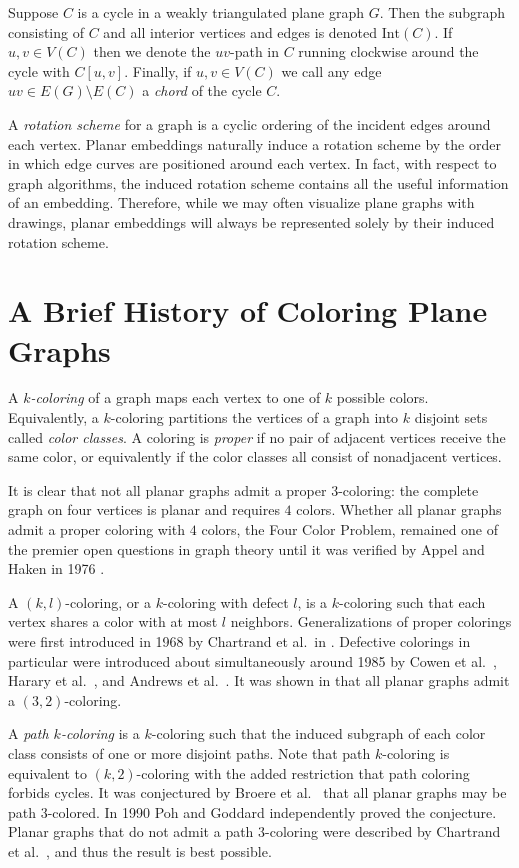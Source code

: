 \documentclass[letterpaper, 12pt]{article}
\theoremstyle{thm}
\begin{document}
Suppose $C$ is a cycle in a weakly
triangulated plane graph $G$. Then the subgraph consisting of $C$ and all interior
vertices and edges is denoted $\text{Int}(C)$. If $u,v \in V(C)$ then we denote
the $uv$-path in $C$ running clockwise around the cycle with $C[u,v]$. Finally,
if $u,v\in V(C)$ we call any edge $uv \in E(G)\setminus E(C)$ a \textit{chord} of
the cycle $C$.

A \textit{rotation scheme} for a graph is a cyclic ordering of the incident
edges around each vertex. Planar embeddings naturally induce a rotation
scheme by the order in which edge curves are positioned around
each vertex. In fact, with respect to graph algorithms, the induced rotation
scheme contains all the useful information of an embedding. Therefore, while we
may often visualize plane graphs with drawings, planar embeddings will always be
represented solely by their induced rotation scheme.

\section{A Brief History of Coloring Plane Graphs}

A $k$\textit{-coloring} of a graph maps each vertex to one of $k$ possible
colors. Equivalently, a $k$-coloring partitions the vertices of a graph into $k$
disjoint sets called \textit{color classes}. 
A coloring is \textit{proper} if no pair of adjacent vertices receive the same
color, or equivalently if the color classes all consist of nonadjacent vertices.

It is clear that not all planar graphs admit a proper $3$-coloring: the
complete graph on four vertices is planar and requires $4$ colors. Whether all
planar graphs admit a proper coloring with $4$ colors, the Four Color Problem,
remained one of the premier open questions in graph theory until it was verified
by Appel and Haken in 1976 \cite{appel1, appel2}.

A $(k,l)$-coloring, or a $k$-coloring with defect $l$, is a
$k$-coloring such that each vertex shares a color with at most $l$ neighbors.
Generalizations of proper colorings were first introduced in 1968 by Chartrand et al.\ in
\cite{chartrand}. Defective colorings in particular were introduced about
simultaneously around 1985 by Cowen et al.\ \cite{cowen}, Harary et al.\ \cite{jones}, and
Andrews et al.\ \cite{jacobson}. It was shown in \cite{cowen} that all
planar graphs admit a $(3,2)$-coloring.

A \textit{path $k$-coloring} is a
$k$-coloring such that the induced subgraph of each color class consists of one
or more disjoint paths. Note that path $k$-coloring is equivalent to
$(k,2)$-coloring with the added restriction that path coloring forbids cycles.
It was conjectured by Broere et al.\ \cite{broere} that all planar graphs may
be path $3$-colored. In 1990 Poh \cite{poh} and Goddard \cite{goddard}
independently proved the conjecture. Planar graphs that do not admit a path $3$-coloring
were described by Chartrand et al.\ \cite{kronk}, and thus the result is best possible.
\end{document}
